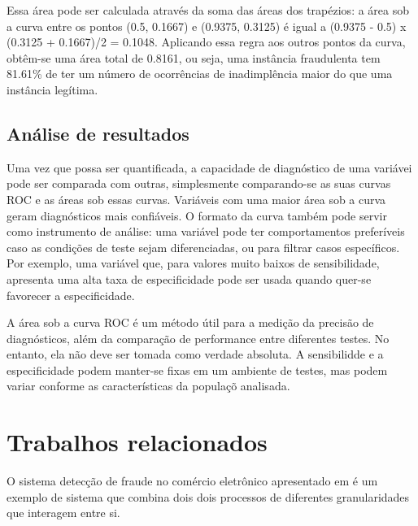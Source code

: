 Essa área pode ser calculada através da soma das áreas dos trapézios: a área sob a curva entre os pontos (0.5, 0.1667) e (0.9375, 0.3125) é igual a (0.9375 - 0.5) x (0.3125 + 0.1667)/2 = 0.1048. Aplicando essa regra aos outros pontos da curva, obtêm-se uma área total de 0.8161, ou seja, uma instância fraudulenta tem 81.61\% de ter um número de ocorrências de inadimplência maior do que uma instância legítima.

\subsection{Análise de resultados}

Uma vez que possa ser quantificada, a capacidade de diagnóstico de uma variávei pode ser comparada com outras, simplesmente comparando-se as suas curvas ROC e as áreas sob essas curvas. Variáveis com uma maior área sob a curva geram diagnósticos mais confiáveis. O formato da curva também pode servir como instrumento de análise: uma variável pode ter comportamentos preferíveis caso as condições de teste sejam diferenciadas, ou para filtrar casos específicos. Por exemplo, uma variável que, para valores muito baixos de sensibilidade, apresenta uma alta taxa de especificidade pode ser usada quando quer-se favorecer a especificidade.

A área sob a curva ROC é um método útil para a medição da precisão de diagnósticos, além da comparação de performance entre diferentes testes. No entanto, ela não deve ser tomada como verdade absoluta. A sensibilidde e a especificidade podem manter-se fixas em um ambiente de testes, mas podem variar conforme as características da populaçõ analisada.

\section{Trabalhos relacionados}

O sistema detecção de fraude no comércio eletrônico apresentado em \citet{Huang2010} é um exemplo de sistema que combina dois dois processos de diferentes granularidades que interagem entre si.

